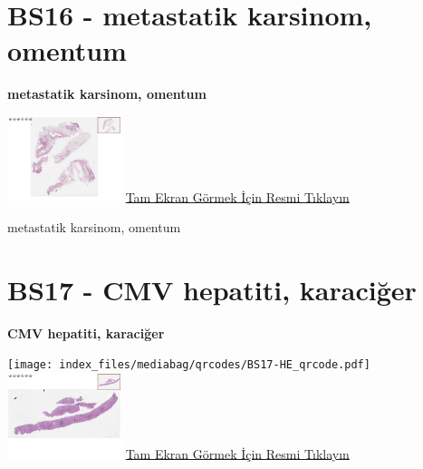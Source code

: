 \documentclass[
  letterpaper,
  DIV=11,
  numbers=noendperiod]{scrreprt}
\begin{document}
\hypertarget{sec-BS16}{%
\section{BS16 - metastatik karsinom, omentum}\label{sec-BS16}}

\textbf{metastatik karsinom, omentum}

\href{https://images.patolojiatlasi.com/BS16/HE.html}{\includegraphics[width=0.25\textwidth,height=\textheight]{./screenshots/thumbnail_BS16-HE.png}}
\href{https://images.patolojiatlasi.com/BS16/HE.html}{Tam Ekran Görmek
İçin Resmi Tıklayın}

\begin{tcolorbox}[enhanced jigsaw, breakable, opacitybacktitle=0.6, arc=.35mm, colbacktitle=quarto-callout-tip-color!10!white, colback=white, toptitle=1mm, left=2mm, opacityback=0, colframe=quarto-callout-tip-color-frame, titlerule=0mm, rightrule=.15mm, bottomrule=.15mm, toprule=.15mm, bottomtitle=1mm, title=\textcolor{quarto-callout-tip-color}{\faLightbulb}\hspace{0.5em}{Tanı}, coltitle=black, leftrule=.75mm]

metastatik karsinom, omentum

\end{tcolorbox}

\hypertarget{sec-BS17}{%
\section{BS17 - CMV hepatiti, karaciğer}\label{sec-BS17}}

\textbf{CMV hepatiti, karaciğer}

\texttt{[image: index\_files/mediabag/qrcodes/BS17-HE\_qrcode.pdf]}
\href{https://images.patolojiatlasi.com/BS17/HE.html}{\includegraphics[width=0.25\textwidth,height=\textheight]{./screenshots/thumbnail_BS17-HE.png}}
\href{https://images.patolojiatlasi.com/BS17/HE.html}{Tam Ekran Görmek
İçin Resmi Tıklayın}
\end{document}
